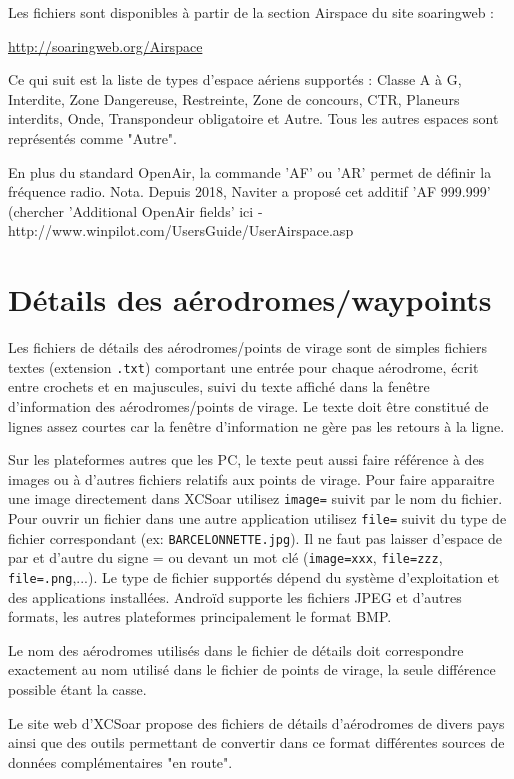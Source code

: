 Les fichiers sont disponibles à partir de la section Airspace du site soaringweb :

{\href{http://soaringweb.org/Airspace/}{http://soaringweb.org/Airspace}}

Ce qui suit est la liste de types d'espace aériens supportés : Classe A à G, Interdite, Zone Dangereuse, Restreinte, Zone de concours, CTR, Planeurs interdits, Onde, Transpondeur obligatoire et Autre. Tous les autres espaces sont représentés comme "Autre".

En plus du standard OpenAir, la commande 'AF' ou 'AR' permet de définir la fréquence radio.
Nota. Depuis 2018, Naviter a proposé cet additif 'AF 999.999' (chercher 'Additional OpenAir fields' ici - http://www.winpilot.com/UsersGuide/UserAirspace.asp

\section{Détails des aérodromes/waypoints}\label{sec:Airfield-details}

Les fichiers de détails des aérodromes/points de virage sont de simples fichiers textes (extension \verb|.txt|) comportant une entrée pour chaque aérodrome, écrit entre crochets et en majuscules, suivi du texte affiché dans la fenêtre d'information des aérodromes/points de virage. Le texte doit être constitué de lignes assez courtes car la fenêtre d'information ne gère pas les retours à la ligne.

Sur les plateformes autres que les PC, le texte peut aussi faire référence à des images ou à d'autres fichiers relatifs aux points de virage. Pour faire apparaitre une image directement dans XCSoar utilisez \verb|image=| suivit par le nom du fichier. Pour ouvrir un fichier dans une autre application utilisez \verb|file=| suivit du type de fichier correspondant (ex: \verb|BARCELONNETTE.jpg|). Il ne faut pas laisser d'espace de par et d'autre du signe = ou devant un mot clé (\verb|image=xxx|, 
 \verb|file=zzz|, \verb|file=.png|,...). Le type de fichier supportés dépend du système d'exploitation et des applications installées. Androïd supporte les fichiers JPEG et d'autres formats, les autres plateformes principalement le format BMP.

Le nom des aérodromes utilisés dans le fichier de détails doit correspondre exactement au nom utilisé dans le fichier de points de virage, la seule différence possible étant la casse.

Le site web d'XCSoar propose des fichiers de détails d'aérodromes de divers pays ainsi que des outils permettant de convertir dans ce format différentes sources de données complémentaires "en route".

